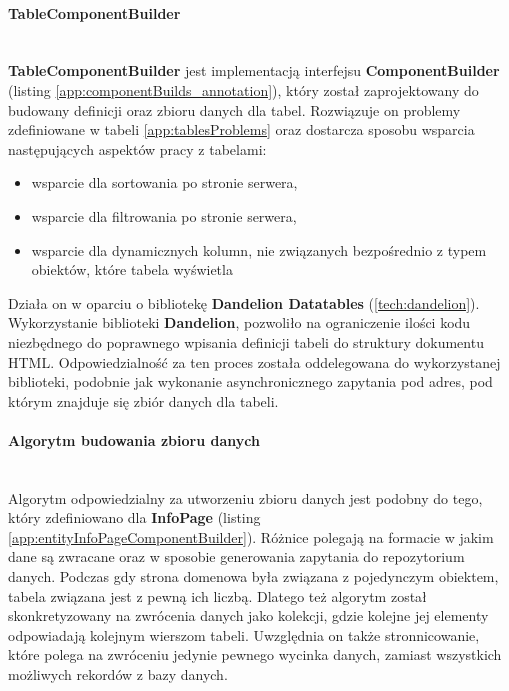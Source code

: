 	\paragraph{TableComponentBuilder} \hspace{0pt} \\
	\textbf{TableComponentBuilder} jest implementacją interfejsu \textbf{ComponentBuilder} (listing \ref{app:componentBuilds_annotation}), który został zaprojektowany do budowany definicji oraz zbioru danych dla tabel. Rozwiązuje on problemy zdefiniowane w tabeli \ref{app:tablesProblems} oraz dostarcza sposobu wsparcia następujących aspektów pracy z tabelami:
	\begin{itemize}
		\item wsparcie dla sortowania po stronie serwera,
		\item wsparcie dla filtrowania po stronie serwera,
		\item wsparcie dla dynamicznych kolumn, nie związanych bezpośrednio z typem obiektów, które tabela wyświetla
	\end{itemize}
	Działa on w oparciu o bibliotekę \textbf{Dandelion Datatables} (\ref{tech:dandelion}). Wykorzystanie biblioteki \textbf{Dandelion}, pozwoliło na ograniczenie ilości kodu niezbędnego do poprawnego wpisania definicji tabeli do struktury dokumentu HTML. Odpowiedzialność za ten proces została oddelegowana do wykorzystanej biblioteki, podobnie jak wykonanie asynchronicznego zapytania pod adres, pod którym znajduje się zbiór danych dla tabeli.
	
	\paragraph{Algorytm budowania zbioru danych} \hspace{0pt} \\
	Algorytm odpowiedzialny za utworzeniu zbioru danych jest podobny do tego, który zdefiniowano dla \textbf{InfoPage} (listing \ref{app:entityInfoPageComponentBuilder}). Różnice polegają na formacie w jakim dane są zwracane oraz w sposobie generowania zapytania do repozytorium danych. Podczas gdy strona domenowa była związana z pojedynczym obiektem, tabela związana jest z pewną ich liczbą. Dlatego też algorytm został skonkretyzowany na zwrócenia danych jako kolekcji, gdzie kolejne jej elementy odpowiadają kolejnym wierszom tabeli. Uwzględnia on także stronnicowanie, które polega na zwróceniu jedynie pewnego wycinka danych, zamiast wszystkich możliwych rekordów z bazy danych.
	\clearpage
	
